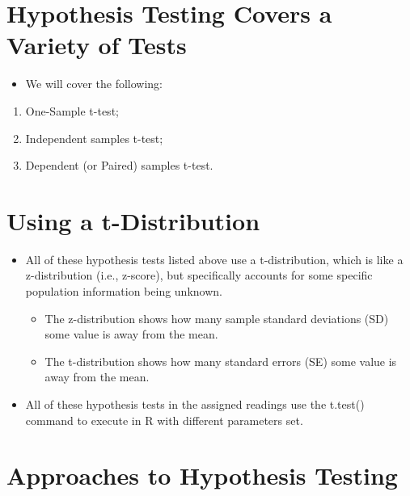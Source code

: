 \documentclass[
  letterpaper,
  DIV=11,
  numbers=noendperiod]{scrreprt}
\providecommand{\tightlist}{%
  \setlength{\itemsep}{0pt}\setlength{\parskip}{0pt}}\usepackage{longtable,booktabs,array}
\begin{document}
\section{Hypothesis Testing Covers a Variety of
Tests}\label{hypothesis-testing-covers-a-variety-of-tests}

\begin{itemize}
\tightlist
\item
  We will cover the following:
\end{itemize}

\begin{enumerate}
\def\labelenumi{\arabic{enumi}.}
\tightlist
\item
  One-Sample t-test;
\item
  Independent samples t-test;
\item
  Dependent (or Paired) samples t-test.
\end{enumerate}

\section{Using a t-Distribution}\label{using-a-t-distribution}

\begin{itemize}
\tightlist
\item
  All of these hypothesis tests listed above use a t-distribution, which
  is like a z-distribution (i.e., z-score), but specifically accounts
  for some specific population information being unknown.

  \begin{itemize}
  \tightlist
  \item
    The z-distribution shows how many sample standard deviations (SD)
    some value is away from the mean.
  \item
    The t-distribution shows how many standard errors (SE) some value is
    away from the mean.
  \end{itemize}
\item
  All of these hypothesis tests in the assigned readings use the
  t.test() command to execute in R with different parameters set.
\end{itemize}

\section{Approaches to Hypothesis
Testing}\label{approaches-to-hypothesis-testing}
\end{document}
